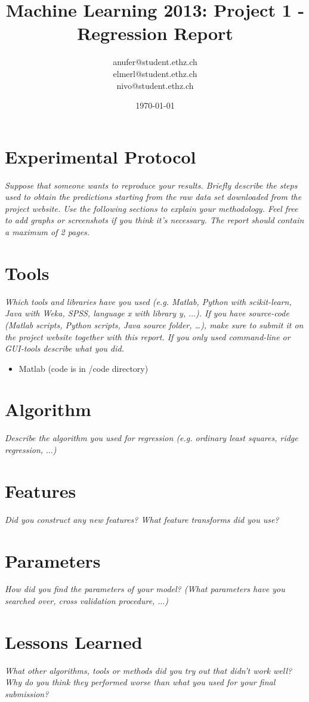\documentclass[a4paper, 11pt]{article}
\title{Machine Learning 2013: Project 1 - Regression Report}
\author{anufer@student.ethz.ch\\ elmerl@student.ethz.ch\\ nivo@student.ethz.ch\\}
\date{\today}
\begin{document}
\maketitle

\section*{Experimental Protocol}
\textit{Suppose that someone wants to reproduce your results. Briefly describe the steps used to obtain the
predictions starting from the raw data set downloaded from the project website. Use the following
sections to explain your methodology. Feel free to add graphs or screenshots if you think it's
necessary. The report should contain a maximum of 2 pages.}

\section{Tools}
\textit{Which tools and libraries have you used (e.g. Matlab, Python with scikit-learn, Java with Weka,
SPSS, language x with library y, $\ldots$). If you have source-code (Matlab scripts, Python scripts, Java source folder, \dots),
make sure to submit it on the project website together with this report. If you only used
command-line or GUI-tools describe what you did.}
\begin{itemize}
\item Matlab (code is in /code directory)
\end{itemize}

\section{Algorithm}
\textit{Describe the algorithm you used for regression (e.g. ordinary least squares, ridge regression, $\ldots$)}


\section{Features}
\textit{Did you construct any new features? What feature transforms did you use?}

\section{Parameters}
\textit{How did you find the parameters of your model? (What parameters have you searched over, cross validation procedure, $\ldots$)}

\section{Lessons Learned}
\textit{What other algorithms, tools or methods did you try out that didn't work well?
Why do you think they performed worse than what you used for your final submission?}
\end{document}
